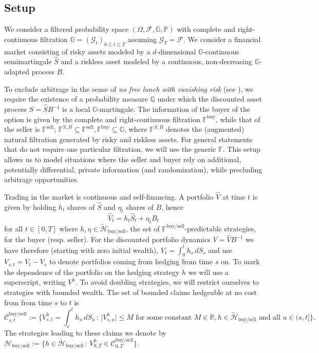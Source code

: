 \documentclass{article}
\newcommand{\Q}{\mathbb{Q}}
\newcommand{\ofgp}{(\Omega,\mathcal{F}, \mathbb{G}, \mathbb{P})}
\begin{document}
\subsection{Setup}

We consider a filtered probability space $\ofgp$ with complete and right-continuous filtration $\mathbb{G} = (\mathcal{G}_t)_{0 \leq t \leq T}$ assuming $\mathcal{G}_T = \mathcal{F}$. We consider a financial market consisting of risky assets modeled by a $d$-dimensional $\mathbb{G}$-continuous semimartingale $\hat{S}$ and a riskless asset modeled by a continuous, non-decreasing $\mathbb{G}$-adapted process $B$.

To exclude arbitrage in the sense of \textit{no free lunch with vanishing risk} (see \cite{DS06}), we require the existence of a probability measure $\Q$ under which the discounted asset process $S=\hat{S}B^{-1}$ is a local $\mathbb{G}$-martingale. The information of the buyer of the option is given by the complete and right-continuous filtration $\mathbb{F}^\text{buy}$, while that of the seller is $\mathbb{F}^\text{sell}$;   $\mathbb{F}^{S,B} \subseteq \mathbb{F}^\text{sell}, \mathbb{F}^\text{buy} \subseteq \mathbb{G}$, where $\mathbb{F}^{S,B}$ denotes the (augmented) natural filtration generated by risky and riskless assets. For general statements that do not require one particular filtration, we will use the generic $\mathbb{F}$. This setup allows us to model situations where the seller and buyer rely on additional, potentially differential, private information (and randomization), while precluding arbitrage opportunities.

Trading in the market is continuous and self-financing. A portfolio $\hat{V}$ at time $t$ is given by holding $h_t$ shares of $\hat{S}$ and $\eta_t$ shares of $B$, hence
\[
	\hat{V}_t = h_t \hat{S}_t + \eta_t B_t
\]
for all $t \in [0,T]$ where $h, \eta \in \tilde{\mathcal{H}}_\text{buy/sell}$, the set of $\mathbb{F}^{\text{buy/sell}}$-predictable strategies, for the buyer (resp. seller). For the discounted portfolio dynamics $V = \hat{V}B^{-1}$ we have therefore (starting with zero initial wealth), $V_t = \int_0^t h_s \, dS_s$ and use $V_{s,t} = V_t -V_s$ to denote portfolios coming from hedging from time $s$ on. To mark the dependence of the portfolio on the hedging strategy $h$ we will use a superscript, writing $V^h$. To avoid doubling strategies, we will restrict ourselves to strategies with bounded wealth. The set of bounded claims hedgeable at no cost from from time $s$ to $t$ is
\[
\mathcal{C}^\text{buy/sell}_{s,t} := \biggl\{V^h_{s,t} = \int_s^t h_u \, dS_u \, : \, \bigl\vert V_{s,u}^h \bigr\vert  \leq M \text{ for some constant } M \in \mathbb{R}, h \in \tilde{\mathcal{H}}_\text{buy/sell} \text{ and all } u \in (s,t]			\biggr\} .
\]
The strategies leading to these claims we denote by $\mathcal{H}_\text{buy/sell} := \bigl\{ h \in \tilde{\mathcal{H}}_\text{buy/sell} \, : \, V^h_{0,T} \in \mathcal{C}^\text{buy/sell}_{0,T}\bigr\}$.
\end{document}
